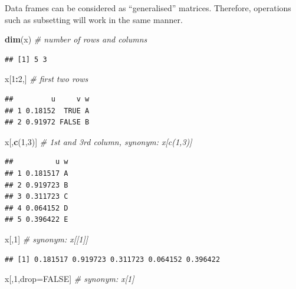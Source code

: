 \documentclass[10pt,b5paper,krantz1]{krantz}
\newenvironment{Shaded}{\begin{snugshade}}{\end{snugshade}}
\newcommand{\CommentTok}[1]{\textcolor[rgb]{0.37,0.37,0.37}{\textit{#1}}}
\newcommand{\DecValTok}[1]{\textcolor[rgb]{0.06,0.06,0.06}{#1}}
\newcommand{\KeywordTok}[1]{\textcolor[rgb]{0.27,0.27,0.27}{\textbf{#1}}}
\newcommand{\NormalTok}[1]{#1}
\newcommand{\OperatorTok}[1]{\textcolor[rgb]{0.43,0.43,0.43}{\textbf{#1}}}
\newcommand{\OtherTok}[1]{\textcolor[rgb]{0.37,0.37,0.37}{#1}}
\begin{document}
Data frames can be considered as ``generalised'' matrices.
Therefore, operations such as subsetting will work in the same manner.

\begin{Shaded}
\begin{Highlighting}[]
\KeywordTok{dim}\NormalTok{(x) }\CommentTok{# number of rows and columns}
\end{Highlighting}
\end{Shaded}

\begin{verbatim}
## [1] 5 3
\end{verbatim}

\begin{Shaded}
\begin{Highlighting}[]
\NormalTok{x[}\DecValTok{1}\OperatorTok{:}\DecValTok{2}\NormalTok{,] }\CommentTok{# first two rows}
\end{Highlighting}
\end{Shaded}

\begin{verbatim}
##         u     v w
## 1 0.18152  TRUE A
## 2 0.91972 FALSE B
\end{verbatim}

\begin{Shaded}
\begin{Highlighting}[]
\NormalTok{x[,}\KeywordTok{c}\NormalTok{(}\DecValTok{1}\NormalTok{,}\DecValTok{3}\NormalTok{)] }\CommentTok{# 1st and 3rd column, synonym: x[c(1,3)]}
\end{Highlighting}
\end{Shaded}

\begin{verbatim}
##          u w
## 1 0.181517 A
## 2 0.919723 B
## 3 0.311723 C
## 4 0.064152 D
## 5 0.396422 E
\end{verbatim}

\begin{Shaded}
\begin{Highlighting}[]
\NormalTok{x[,}\DecValTok{1}\NormalTok{] }\CommentTok{# synonym: x[[1]]}
\end{Highlighting}
\end{Shaded}

\begin{verbatim}
## [1] 0.181517 0.919723 0.311723 0.064152 0.396422
\end{verbatim}

\begin{Shaded}
\begin{Highlighting}[]
\NormalTok{x[,}\DecValTok{1}\NormalTok{,drop=}\OtherTok{FALSE}\NormalTok{] }\CommentTok{# synonym: x[1]}
\end{Highlighting}
\end{Shaded}
\end{document}

